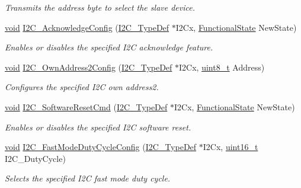 \begin{DoxyCompactItemize}
\begin{DoxyCompactList}\small\item\em Transmits the address byte to select the slave device. \end{DoxyCompactList}\item 
\hyperlink{group___n_a_m_e_ga18028b8badbf1ea7e704ccac3c488e82}{void} \hyperlink{group___i2_c___group1_ga7bb44e894d68a7991f564c43fb187486}{I2\-C\-\_\-\-Acknowledge\-Config} (\hyperlink{struct_i2_c___type_def}{I2\-C\-\_\-\-Type\-Def} $\ast$I2\-Cx, \hyperlink{group___exported__types_gac9a7e9a35d2513ec15c3b537aaa4fba1}{Functional\-State} New\-State)
\begin{DoxyCompactList}\small\item\em Enables or disables the specified I2\-C acknowledge feature. \end{DoxyCompactList}\item 
\hyperlink{group___n_a_m_e_ga18028b8badbf1ea7e704ccac3c488e82}{void} \hyperlink{group___i2_c___group1_ga7be2cc634a613c8e3539137e897a22df}{I2\-C\-\_\-\-Own\-Address2\-Config} (\hyperlink{struct_i2_c___type_def}{I2\-C\-\_\-\-Type\-Def} $\ast$I2\-Cx, \hyperlink{stdint_8h_aba7bc1797add20fe3efdf37ced1182c5}{uint8\-\_\-t} Address)
\begin{DoxyCompactList}\small\item\em Configures the specified I2\-C own address2. \end{DoxyCompactList}\item 
\hyperlink{group___n_a_m_e_ga18028b8badbf1ea7e704ccac3c488e82}{void} \hyperlink{group___i2_c___group1_ga1289c908aeb882443aba323b459c638b}{I2\-C\-\_\-\-Software\-Reset\-Cmd} (\hyperlink{struct_i2_c___type_def}{I2\-C\-\_\-\-Type\-Def} $\ast$I2\-Cx, \hyperlink{group___exported__types_gac9a7e9a35d2513ec15c3b537aaa4fba1}{Functional\-State} New\-State)
\begin{DoxyCompactList}\small\item\em Enables or disables the specified I2\-C software reset. \end{DoxyCompactList}\item 
\hyperlink{group___n_a_m_e_ga18028b8badbf1ea7e704ccac3c488e82}{void} \hyperlink{group___i2_c___group1_gaa570f76bc34e5b0531b29b1a90af1275}{I2\-C\-\_\-\-Fast\-Mode\-Duty\-Cycle\-Config} (\hyperlink{struct_i2_c___type_def}{I2\-C\-\_\-\-Type\-Def} $\ast$I2\-Cx, \hyperlink{stdint_8h_a273cf69d639a59973b6019625df33e30}{uint16\-\_\-t} I2\-C\-\_\-\-Duty\-Cycle)
\begin{DoxyCompactList}\small\item\em Selects the specified I2\-C fast mode duty cycle. \end{DoxyCompactList}\item 

\end{DoxyCompactItemize}
